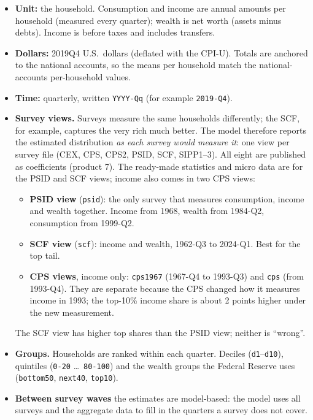 \documentclass[11pt]{article}
\newcommand{\file}[1]{\texttt{#1}}
\begin{document}
\begin{itemize}
  \item \textbf{Unit:} the household. Consumption and income are annual amounts per household
        (measured every quarter); wealth is net worth (assets minus debts). Income is before taxes and
        includes transfers.
  \item \textbf{Dollars:} 2019Q4 U.S.\ dollars (deflated with the CPI-U). Totals are anchored to the
        national accounts, so the means per household match the national-accounts per-household values.
  \item \textbf{Time:} quarterly, written \file{YYYY-Qq} (for example \file{2019-Q4}).
  \item \textbf{Survey views.} Surveys measure the same households differently; the SCF, for
        example, captures the very rich much better. The model therefore reports the estimated
        distribution \emph{as each survey would measure it}: one view per survey file (CEX, CPS, CPS2,
        PSID, SCF, SIPP1--3). All eight are published as coefficients (product 7). The ready-made
        statistics and micro data are for the PSID and SCF views; income also comes in two CPS views:
        \begin{itemize}
          \item \textbf{PSID view} (\file{psid}): the only survey that measures consumption, income and
                wealth together. Income from 1968, wealth from 1984-Q2, consumption from 1999-Q2.
          \item \textbf{SCF view} (\file{scf}): income and wealth, 1962-Q3 to 2024-Q1. Best for the top tail.
          \item \textbf{CPS views}, income only: \file{cps1967} (1967-Q4 to 1993-Q3) and \file{cps}
                (from 1993-Q4). They are separate because the CPS changed how it measures income in 1993;
                the top-10\% income share is about 2 points higher under the new measurement.
        \end{itemize}
        The SCF view has higher top shares than the PSID view; neither is ``wrong''.
  \item \textbf{Groups.} Households are ranked within each quarter. Deciles (\file{d1}--\file{d10}),
        quintiles (\file{0-20} \dots\ \file{80-100}) and the wealth groups the Federal Reserve uses
        (\file{bottom50}, \file{next40}, \file{top10}).
  \item \textbf{Between survey waves} the estimates are model-based: the model uses all surveys and the
        aggregate data to fill in the quarters a survey does not cover.
\end{itemize}
\end{document}
